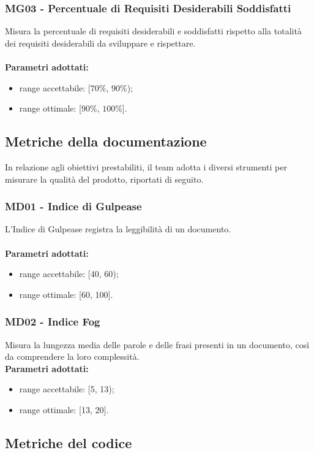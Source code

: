\subsubsection{MG03 - Percentuale di Requisiti Desiderabili Soddisfatti}
Misura la percentuale di requisiti desiderabili e soddisfatti rispetto alla totalità dei requisiti desiderabili da sviluppare e rispettare.\\ \\ 
\textbf{Parametri adottati:} 
\begin{itemize}
\item range accettabile: [$70\%$, $90\%$);
\item range ottimale: [$90\%$, $100\%$].
\end{itemize}

\subsection{Metriche della documentazione}
In relazione agli obiettivi prestabiliti, il team adotta i diversi strumenti per misurare la qualità del prodotto, riportati di seguito.
\subsubsection{MD01 - Indice di Gulpease}
L'Indice di Gulpease registra la leggibilità di un documento. \\ \\ 
\textbf{Parametri adottati:} 
\begin{itemize}
\item range accettabile: [40, 60);
\item range ottimale: [60, 100].
\end{itemize}

\subsubsection{MD02 - Indice Fog}
Misura la lungezza media delle parole e delle frasi presenti in un documento, così da comprendere la loro complessità.\\
\textbf{Parametri adottati:} 
\begin{itemize}
\item range accettabile: [5, 13);
\item range ottimale: [13, 20].
\end{itemize}

\subsection{Metriche del codice}

